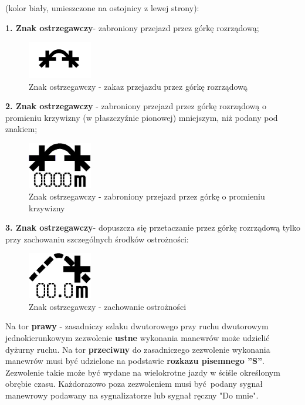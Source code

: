 (kolor biały, umieszczone na ostojnicy z lewej strony):

\textbf{1. Znak ostrzegawczy}- zabroniony przejazd przez górkę rozrządową;
\begin{figure}
	\includegraphics[width=0.25\textwidth]{skryptkierownik-img/skryptkierownik-img024.jpg}
	\caption{Znak ostrzegawczy - zakaz przejazdu przez górkę rozrządową}
\end{figure}

\textbf{2. Znak ostrzegawczy} - zabroniony przejazd przez górkę rozrządową o promieniu krzywizny (w płaszczyźnie pionowej) mniejszym, niż podany pod znakiem;
\begin{figure}
	\includegraphics[width=0.25\textwidth]{skryptkierownik-img/skryptkierownik-img025.jpg}
	\caption{Znak ostrzegawczy - zabroniony przejazd przez górkę o promieniu krzywizny}
\end{figure}
\textbf{3. Znak ostrzegawczy}- dopuszcza się przetaczanie przez górkę rozrządową tylko przy zachowaniu szczególnych środków ostrożności:
\begin{figure}
	\includegraphics[width=0.25\textwidth]{skryptkierownik-img/skryptkierownik-img026.jpg}
	\caption{Znak ostrzegawczy - zachowanie ostrożności}
\end{figure}

Na tor \textbf{prawy} - zasadniczy szlaku dwutorowego przy ruchu dwutorowym jednokierunkowym zezwolenie \textbf{ustne} wykonania manewrów może udzielić dyżurny ruchu. Na tor \textbf{przeciwny} do zasadniczego zezwolenie wykonania manewrów musi być udzielone na podstawie \textbf{rozkazu pisemnego ''S''}. Zezwolenie takie może być wydane na wielokrotne jazdy w ściśle określonym obrębie czasu. Każdorazowo poza zezwoleniem musi być podany sygnał manewrowy podawany na sygnalizatorze lub sygnał ręczny "Do mnie".

